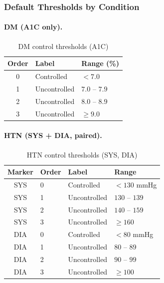 \documentclass[11pt,a4paper]{article}
\begin{document}
\subsubsection{Default Thresholds by Condition}

\paragraph{DM (A1C only).}

\begin{table}[ht]
\centering
\caption{DM control thresholds (A1C)}
\begin{tabular}{@{}cll@{}}
\toprule
\textbf{Order} & \textbf{Label} & \textbf{Range (\%)} \\
\midrule
0 & Controlled      & $< 7.0$ \\
1 & Uncontrolled    & $7.0$ -- $7.9$ \\
2 & Uncontrolled    & $8.0$ -- $8.9$ \\
3 & Uncontrolled    & $\geq 9.0$ \\
\bottomrule
\end{tabular}
\end{table}

\paragraph{HTN (SYS + DIA, paired).}

\begin{table}[ht]
\centering
\caption{HTN control thresholds (SYS, DIA)}
\begin{tabular}{@{}clll@{}}
\toprule
\textbf{Marker} & \textbf{Order} & \textbf{Label} & \textbf{Range} \\
\midrule
SYS & 0 & Controlled      & $< 130$ mmHg \\
SYS & 1 & Uncontrolled    & $130$ -- $139$ \\
SYS & 2 & Uncontrolled    & $140$ -- $159$ \\
SYS & 3 & Uncontrolled    & $\geq 160$ \\
\midrule
DIA & 0 & Controlled      & $< 80$ mmHg \\
DIA & 1 & Uncontrolled    & $80$ -- $89$ \\
DIA & 2 & Uncontrolled    & $90$ -- $99$ \\
DIA & 3 & Uncontrolled    & $\geq 100$ \\
\bottomrule
\end{tabular}
\end{table}
\end{document}
